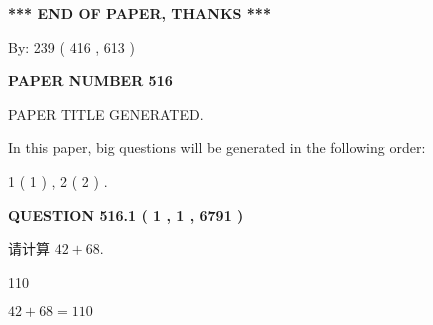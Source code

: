\documentclass{ctexart}
\begin{document}
   
   
   
\vspace{1.0in} 
{\textbf{\large{ *** END OF PAPER, THANKS *** }}} 
   
   
\hspace{1.0in} By: 
 239 ( 416 ,  613 )
   
   
   
   
\newpage 
\setcounter{page}{ 
   516001 } 
   
   
   
   
 {\textbf{ \Large{ PAPER NUMBER  516  }}}
   
   
\vspace{0.2in}
   
   
   
   
   
   
   
   
 \vspace{0.2in}
 
 
 
 
   
   
 PAPER TITLE GENERATED.
   
   
   
\vspace{0.2in}
   
In this paper, big questions will be generated in the following order: 
   
   
   1 ( 1 )
 ,
   2 ( 2 )
 .
  
\vspace{0.2in}
  
{\textbf{\Large{QUESTION
516.1 
 ( 1 , 1 , 6791 )
}}}
  
  
 
请计算 $ %
42 +  %
68 $.
 
 
 
\noindent{}
 
 

110
 
 
\noindent{}
 
 

 
 
 
\noindent{}
 
 

$ %
42 +  %
68=   %
110$
 
\end{document}
